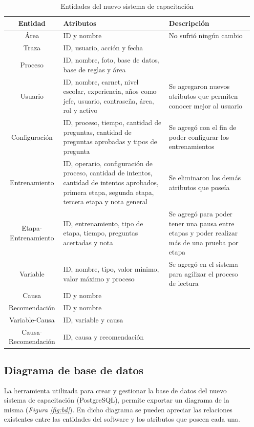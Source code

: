\begin{table}[H]
\centering
\begin{center}
\begin{tabular}{ | c | p{5cm} |  p{5cm} | }
\hline
\textbf{Entidad} & \textbf{Atributos}  & \textbf{Descripción}\\
\hline
Área & ID y nombre & No sufrió ningún cambio \\
\cline{1-2}
Traza & ID, usuario, acción y fecha &  \\
\cline{1-2}
Proceso & ID, nombre, foto, base de datos, base de reglas y área &  \\
\hline
Usuario & ID, nombre, carnet, nivel escolar, experiencia, años como jefe, usuario, contraseña, área, rol y activo & Se agregaron nuevos atributos que permiten conocer mejor al usuario\\
\hline
Configuración & ID, proceso, tiempo, cantidad de preguntas, cantidad de preguntas aprobadas y tipos de pregunta & Se agregó con el fin de poder configurar los entrenamientos \\
\hline
Entrenamiento & ID, operario, configuración de proceso, cantidad de intentos, cantidad de intentos aprobados, primera etapa, segunda etapa, tercera etapa y nota general & Se eliminaron los demás atributos que poseía \\
\hline
Etapa-Entrenamiento & ID, entrenamiento, tipo de etapa, tiempo, preguntas acertadas y nota & Se agregó para poder tener una pausa entre etapas y poder realizar más de una prueba por etapa \\
\hline
Variable & ID, nombre, tipo, valor mínimo, valor máximo y proceso & Se agregó en el sistema para agilizar el proceso de lectura \\
\cline{1-2}
Causa & ID y nombre &  \\
\cline{1-2}
Recomendación & ID y nombre & \\
\cline{1-2}
Variable-Causa & ID, variable y causa &  \\
\cline{1-2}
Causa-Recomendación & ID, causa y recomendación &  \\
\hline
\end{tabular}
\caption{Entidades del nuevo sistema de capacitación}
\label{tab:entidades}
\end{center}
\end{table}

\subsection{Diagrama de base de datos}
La herramienta utilizada para crear y gestionar la base de datos del nuevo sistema de capacitación (PostgreSQL), permite exportar un diagrama de la misma (\textsl{Figura \ref{fig:bd}}). En dicho diagrama se pueden apreciar las relaciones existentes entre las entidades del software y los atributos que poseen cada una.

